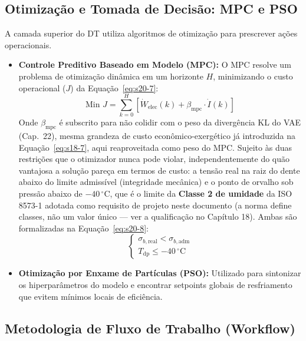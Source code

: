 \documentclass[12pt,a4paper]{article}
\numberwithin{equation}{section}
\numberwithin{table}{section}
\numberwithin{figure}{section}
\begin{document}
	\subsection{Otimização e Tomada de Decisão: MPC e PSO}
	
	A camada superior do DT utiliza algoritmos de otimização para prescrever ações operacionais.
	
	\begin{itemize}
		\item \textbf{Controle Preditivo Baseado em Modelo (MPC):}
		O MPC resolve um problema de otimização dinâmica em um horizonte $H$, minimizando o custo operacional ($J$) da Equação~\eqref{eq:s20-7}:
		\begin{equation}\label{eq:s20-7}
 \text{Min } J = \sum_{k=0}^{H} \left[ \dot{W}_{\text{elec}}(k) + \beta_{\text{mpc}} \cdotp \dot{I}(k) \right]
\end{equation}
			Onde $\beta_{\text{mpc}}$ é subscrito para não colidir com o peso da divergência KL do VAE (Cap.~22), mesma grandeza de custo econômico-exergético já introduzida na Equação~\eqref{eq:s18-7}, aqui reaproveitada como peso do MPC.
		Sujeito às duas restrições que o otimizador nunca pode violar, independentemente do quão vantajosa a solução pareça em termos de custo: a tensão real na raiz do dente abaixo do limite admissível (integridade mecânica) e o ponto de orvalho sob pressão abaixo de $-40\,^{\circ}$C, que é o limite da \textbf{Classe 2 de umidade} da ISO 8573-1 \cite{iso8573} adotada como requisito de projeto neste documento (a norma define classes, não um valor único — ver a qualificação no Capítulo 18). Ambas são formalizadas na Equação~\eqref{eq:s20-8}:
		\begin{equation}\label{eq:s20-8}
 \begin{cases} \sigma_{b,\text{real}} < \sigma_{b,\text{adm}} \\ T_{\text{dp}} \le -40\,^{\circ}\text{C} \end{cases}
\end{equation}
		
		\item \textbf{Otimização por Enxame de Partículas (PSO):}
		Utilizado para sintonizar os hiperparâmetros do modelo e encontrar setpoints globais de resfriamento que evitem mínimos locais de eficiência.
	\end{itemize}
	
	\subsection{Metodologia de Fluxo de Trabalho (Workflow)}
	
\end{document}
